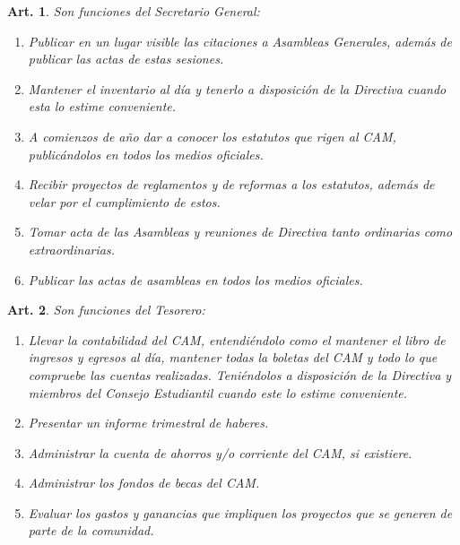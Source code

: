 \documentclass[letterpaper,11pt]{article}
\theoremstyle{plain}
\newtheorem{art}{Art.} %
\begin{document}
\begin{art}\label{funcionesSecretario}
	Son funciones del Secretario General:
	\begin{enumerate}
		\item Publicar en un lugar visible las citaciones a Asambleas Generales, además de publicar las actas de estas sesiones.
		\item Mantener el inventario al día y tenerlo a disposición de la Directiva cuando esta lo estime conveniente.
		\item A comienzos de año dar a conocer los estatutos que rigen al CAM, publicándolos en todos los medios oficiales.
		\item Recibir proyectos de reglamentos y de reformas a los estatutos, además de velar por el cumplimiento de estos.
		\item Tomar acta de las Asambleas y reuniones de Directiva tanto ordinarias como extraordinarias.
		\item Publicar las actas de asambleas en todos los medios oficiales.
	\end{enumerate}
\end{art}

\begin{art}\label{funcionesTesorero}
	Son funciones del Tesorero:
	\begin{enumerate}
		\item Llevar la contabilidad del CAM, entendiéndolo como el mantener el libro de ingresos y egresos al día, mantener todas la boletas del CAM y todo lo que compruebe las cuentas realizadas. Teniéndolos a disposición de la Directiva y miembros del Consejo Estudiantil cuando este lo estime conveniente.
		\item Presentar un informe trimestral de haberes.
		\item Administrar la cuenta de ahorros y/o corriente del CAM, si existiere.
		\item Administrar los fondos de becas del CAM.
		\item Evaluar los gastos y ganancias que impliquen los proyectos que se generen de parte de la comunidad.
	\end{enumerate}
\end{art}
\end{document}
